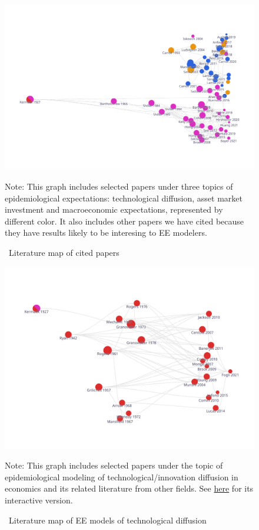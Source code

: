 \newpage

\begin{figure}[!ht] \centering  %
	\caption{ ~Literature map of cited papers}
	\label{fig:graph_mixer}
	\centerline{\includegraphics[width=\textwidth]{./figures/graph_mixer}}
	\begin{flushleft}
		{\footnotesize Note: This graph includes selected papers under three topics of epidemiological expectations: technological diffusion, asset market investment and macroeconomic expectations, represented by different color.  It also includes other papers we have cited because they have results likely to be interesing to EE modelers.}
	\end{flushleft}
\end{figure}

\newpage

\begin{figure}[!ht] \centering  %
	\caption{ ~Literature map of EE models of technological diffusion}
	\label{fig:graph_diffusion}
	\centerline{\includegraphics[width=\textwidth]{./figures/graph_diffusion}}
		\begin{flushleft}
{\footnotesize Note: This graph includes selected papers under the topic of epidemiological modeling of technological/innovation diffusion in economics and its related literature from other fields. See \href{https://app.litmaps.co/shared/1D9003CB-75FE-4633-B60A-79B70E03B691}{here} for its interactive version.}
				\end{flushleft}
\end{figure}

